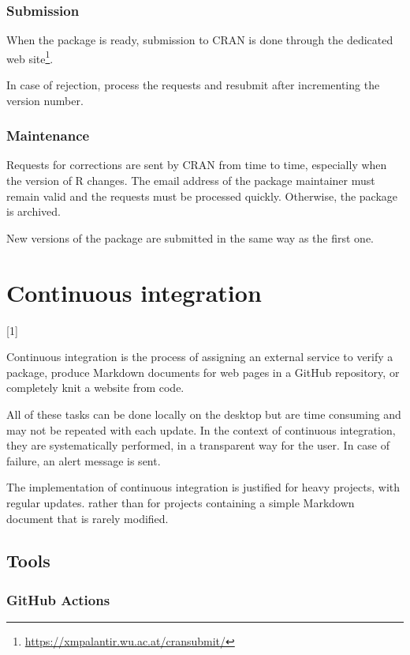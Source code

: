 \documentclass[
  12pt,
  american,
  a4paper,
  extrafontsizes,onecolumn,openright
  ]{memoir}
\newlength{\rf}
\newcommand{\toc}[1]{%
  \startcontents[chapters]%
  \printcontents[chapters]{}{1}[#1]{}%
  ~\newline%
}
\begin{document}
\subsection{Submission}\label{submission}

When the package is ready, submission to CRAN is done through the dedicated web site\footnote{\url{https://xmpalantir.wu.ac.at/cransubmit/}}.

In case of rejection, process the requests and resubmit after incrementing the version number.

\subsection{Maintenance}\label{maintenance}

Requests for corrections are sent by CRAN from time to time, especially when the version of R changes.
The email address of the package maintainer must remain valid and the requests must be processed quickly.
Otherwise, the package is archived.

New versions of the package are submitted in the same way as the first one.

\chapter{Continuous integration}\label{chap-ci}

\toc{1}

Continuous integration is the process of assigning an external service to verify a package, produce Markdown documents for web pages in a GitHub repository, or completely knit a website from code.

All of these tasks can be done locally on the desktop but are time consuming and may not be repeated with each update.
In the context of continuous integration, they are systematically performed, in a transparent way for the user.
In case of failure, an alert message is sent.

The implementation of continuous integration is justified for heavy projects, with regular updates.
rather than for projects containing a simple Markdown document that is rarely modified.

\section{Tools}\label{tools}

\subsection{GitHub Actions}\label{github-actions}
\end{document}
